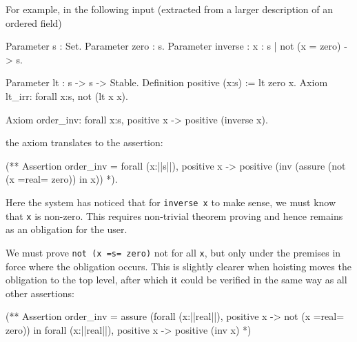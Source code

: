 For example, in the following input (extracted from a larger description of an ordered field)
\begin{source}
Parameter s : Set.
Parameter zero : s.
Parameter inverse : {x : s | not (x = zero)} -> s.

Parameter lt : s -> s -> Stable.
Definition positive (x:s) := lt zero x.
Axiom lt_irr: forall x:s, not (lt x x).

Axiom order_inv: forall x:s, positive x -> positive (inverse x).
\end{source}
the axiom translates to the assertion:
\begin{source}
	(**  Assertion order_inv = 
          forall (x:||s||),  positive x ->
            positive (inv (assure (not (x =real= zero)) in x))
   *).
\end{source}
Here the system has noticed that for \Verb|inverse x| to make sense, we must know that
\Verb|x| is non-zero.   This requires non-trivial theorem proving and hence remains as 
an obligation for the user.  

We must prove \Verb|not (x =s= zero)| not for all \Verb|x|, but only under
the premises in force where the obligation occurs.  This is slightly clearer when hoisting moves the
obligation to the top level, after which it could be verified in the same way as all other assertions:
\begin{source}
   (**  Assertion order_inv = 
          assure (forall (x:||real||),  positive x -> not (x =real= zero))
            in forall (x:||real||),  positive x -> positive (inv x)
   *)	
\end{source}


